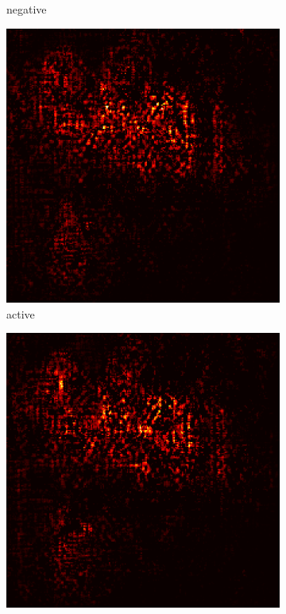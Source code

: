 \documentclass[preprint,12pt]{elsarticle}
\begin{document}
\begin{figure}
\begin{subfigure}{0.14\textwidth}
        \caption{negative}
    \end{subfigure}
    \hfill
    \begin{subfigure}{0.14\textwidth}
        \centering
        \includegraphics[width=\linewidth]{../visualizations/examples/imagenette/resnet18/active_saliency_map/5.png}
        \caption{active}
    \end{subfigure}
    \hfill
    \begin{subfigure}{0.14\textwidth}
        \centering
        \includegraphics[width=\linewidth]{../visualizations/examples/imagenette/resnet18/inactive_saliency_map/5.png}

\end{subfigure}
\end{figure}
\end{document}
